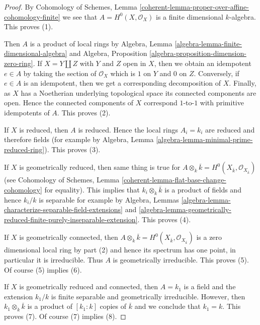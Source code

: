 \begin{proof}
By Cohomology of Schemes, Lemma
\ref{coherent-lemma-proper-over-affine-cohomology-finite}
we see that $A = H^0(X, \mathcal{O}_X)$ is a finite dimensional
$k$-algebra. This proves (1).

\medskip\noindent
Then $A$ is a product of local rings by
Algebra, Lemma \ref{algebra-lemma-finite-dimensional-algebra} and
Algebra, Proposition \ref{algebra-proposition-dimension-zero-ring}.
If $X = Y \amalg Z$ with $Y$ and $Z$ open in $X$, then we obtain
an idempotent $e \in A$ by taking the section of $\mathcal{O}_X$
which is $1$ on $Y$ and $0$ on $Z$. Conversely, if $e \in A$
is an idempotent, then we get a corresponding decomposition of $X$.
Finally, as $X$ has a Noetherian underlying topological space
its connected components are open. Hence the connected components
of $X$ correspond $1$-to-$1$ with primitive idempotents of $A$.
This proves (2).

\medskip\noindent
If $X$ is reduced, then $A$ is reduced. Hence the local rings $A_i = k_i$
are reduced and therefore fields (for example by
Algebra, Lemma \ref{algebra-lemma-minimal-prime-reduced-ring}).
This proves (3).

\medskip\noindent
If $X$ is geometrically reduced, then same thing is true for
$A \otimes_k \overline{k} =
H^0(X_{\overline{k}}, \mathcal{O}_{X_{\overline{k}}})$
(see Cohomology of Schemes, Lemma
\ref{coherent-lemma-flat-base-change-cohomology} for equality).
This implies that $k_i \otimes_k \overline{k}$ is a product
of fields and hence $k_i/k$ is separable for example by
Algebra,
Lemmas \ref{algebra-lemma-characterize-separable-field-extensions} and
\ref{algebra-lemma-geometrically-reduced-finite-purely-inseparable-extension}.
This proves (4).

\medskip\noindent
If $X$ is geometrically connected, then $A \otimes_k \overline{k} =
H^0(X_{\overline{k}}, \mathcal{O}_{X_{\overline{k}}})$
is a zero dimensional local ring by part (2) and hence its
spectrum has one point, in particular it is irreducible.
Thus $A$ is geometrically irreducible. This proves (5).
Of course (5) implies (6).

\medskip\noindent
If $X$ is geometrically reduced and connected, then
$A = k_1$ is a field and the extension $k_1/k$ is finite separable and
geometrically irreducible. However, then $k_1 \otimes_k \overline{k}$
is a product of $[k_1 : k]$ copies of $\overline{k}$ and we conclude
that $k_1 = k$. This proves (7). Of course (7) implies (8).
\end{proof}





